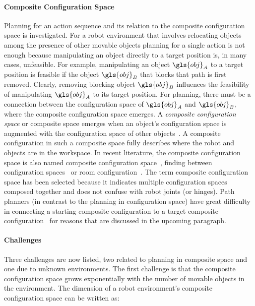 \paragraph{Composite Configuration Space}
Planning for an action sequence and its relation to the composite configuration space is investigated. For a robot environment that involves relocating objects among the presence of other movable objects planning for a single action is not enough because manipulating an object directly to a target position is, in many cases, unfeasible. For example, manipulating an object $\gls{obj}_A$ to a target position is feasible if the object $\gls{obj}_B$ that blocks that path is first removed. Clearly, removing blocking object $\gls{obj}_B$ influences the feasibility of manipulating $\gls{obj}_A$ to its target position. For planning, there must be a connection between the configuration space of $\gls{obj}_A$ and $\gls{obj}_B$, where the composite configuration space emerges. A \textit{composite configuration space} or composite space emerges when an object's configuration space is augmented with the configuration space of other objects~\cite{vandenberg_path_2009}. A composite configuration in such a composite space fully describes where the robot and objects are in the workspace. In recent literature, the composite configuration space is also named composite configuration space~\cite{vega-brown_asymptotically_2020}, finding  between configuration spaces~\cite{hauser_multimodal_2010} or room configuration~\cite{sabbaghnovin_model_2021}. The term composite configuration space has been selected because it indicates multiple configuration spaces composed together and does not confuse with robot joints (or hinges). Path planners (in contrast to the planning in configuration space) have great difficulty in connecting a starting composite configuration to a target composite configuration~\cite{roynicholas_hierarchy_2021} for reasons that are discussed in the upcoming paragraph.\bs

\paragraph{Challenges}
Three challenges are now listed, two related to planning in composite space and one due to unknown environments. The first challenge is that the composite configuration space grows exponentially with the number of movable objects in the environment. The dimension of a robot environment's composite configuration space can be written as:


